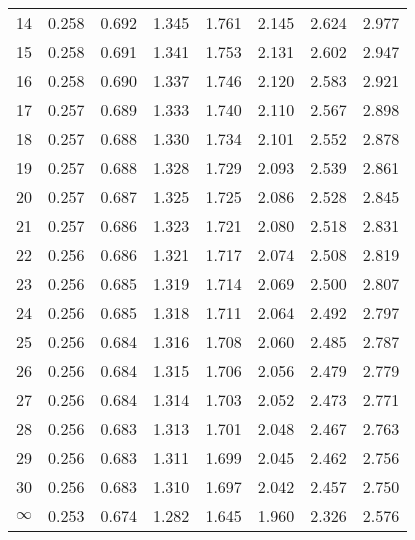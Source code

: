 \documentclass[1pt]{report}
\newcommand{\<}{\langle}
\renewcommand{\>}{\rangle}
\begin{document}
\begin{table}[H]
{{{\begin{tabular}{| l | l l l l l l l |}
  14 & 0.258 & 0.692 & 1.345 & 1.761 & 2.145 & 2.624 & 2.977 \\ 
  15 & 0.258 & 0.691 & 1.341 & 1.753 & 2.131 & 2.602 & 2.947 \\ 
  16 & 0.258 & 0.690 & 1.337 & 1.746 & 2.120 & 2.583 & 2.921 \\ 
  17 & 0.257 & 0.689 & 1.333 & 1.740 & 2.110 & 2.567 & 2.898 \\ 
  18 & 0.257 & 0.688 & 1.330 & 1.734 & 2.101 & 2.552 & 2.878 \\ 
  19 & 0.257 & 0.688 & 1.328 & 1.729 & 2.093 & 2.539 & 2.861 \\ 
  20 & 0.257 & 0.687 & 1.325 & 1.725 & 2.086 & 2.528 & 2.845 \\ \hline \hline
  21 & 0.257 & 0.686 & 1.323 & 1.721 & 2.080 & 2.518 & 2.831 \\ 
  22 & 0.256 & 0.686 & 1.321 & 1.717 & 2.074 & 2.508 & 2.819 \\ 
  23 & 0.256 & 0.685 & 1.319 & 1.714 & 2.069 & 2.500 & 2.807 \\ 
  24 & 0.256 & 0.685 & 1.318 & 1.711 & 2.064 & 2.492 & 2.797 \\ 
  25 & 0.256 & 0.684 & 1.316 & 1.708 & 2.060 & 2.485 & 2.787 \\ 
  26 & 0.256 & 0.684 & 1.315 & 1.706 & 2.056 & 2.479 & 2.779 \\ 
  27 & 0.256 & 0.684 & 1.314 & 1.703 & 2.052 & 2.473 & 2.771 \\ 
  28 & 0.256 & 0.683 & 1.313 & 1.701 & 2.048 & 2.467 & 2.763 \\ 
  29 & 0.256 & 0.683 & 1.311 & 1.699 & 2.045 & 2.462 & 2.756 \\ 
  30 & 0.256 & 0.683 & 1.310 & 1.697 & 2.042 & 2.457 & 2.750 \\ 
  $\infty$ & 0.253 & 0.674 & 1.282 & 1.645 & 1.960 & 2.326 & 2.576 \\ \hline
\end{tabular}}}}
\end{table}
\end{document}
